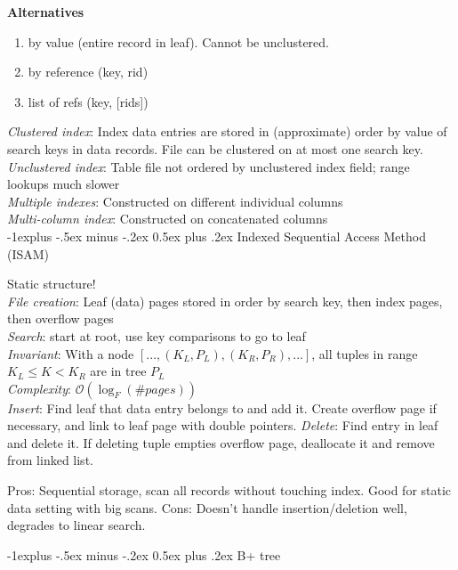 \documentclass[10pt,landscape]{article}
\makeatletter
\renewcommand{\subsection}{\@startsection{subsection}{2}{0mm}%
                                {-1explus -.5ex minus -.2ex}%
                                {0.5ex plus .2ex}%
                                {\normalfont\normalsize\bfseries}}
\makeatother
\begin{document}
\begin{multicols}{3}
\textbf{Alternatives}

\begin{enumerate}
  \item by value (entire record in leaf). Cannot be unclustered.
  \item by reference (key, rid)
  \item list of refs (key, [rids])
\end{enumerate}

\textit{Clustered index}: Index data entries are stored in (approximate) order by value of search keys in data records. File can be clustered on at most one search key. \\
\textit{Unclustered index}: Table file not ordered by unclustered index field; range lookups much slower \\
\textit{Multiple indexes}: Constructed on different individual columns \\
\textit{Multi-column index}: Constructed on concatenated columns \\


\subsection{Indexed Sequential Access Method (ISAM)}

Static structure! \\
\textit{File creation}: Leaf (data) pages stored in order by search key, then index pages, then overflow pages \\
\textit{Search}: start at root, use key comparisons to go to leaf \\
\textit{Invariant}: With a node $[..., (K_L, P_L), (K_R, P_R), ...]$, all tuples in range $K_L \le K < K_R$ are in tree $P_L$ \\
\textit{Complexity}: $\mathcal{O}(\log_F(\# pages))$ \\
\textit{Insert}: Find leaf that data entry belongs to and add it. Create overflow page if necessary, and link to leaf page with double pointers.
\textit{Delete}: Find entry in leaf and delete it. If deleting tuple empties overflow page, deallocate it and remove from linked list.

Pros: Sequential storage, scan all records without touching index. Good for static data setting with big scans. Cons: Doesn't handle insertion/deletion well, degrades to linear search.

\subsection{B+ tree}


\end{multicols}
\end{document}
